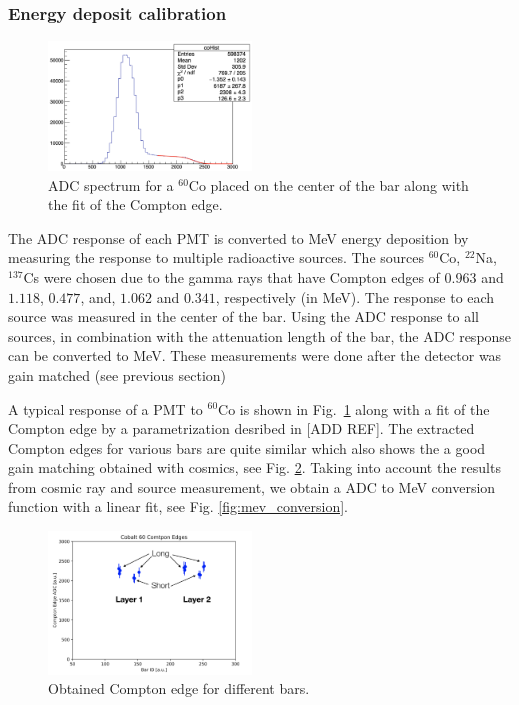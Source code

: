 \documentclass[3p,final,twocolumn]{elsarticle}
\begin{document}
\subsubsection{Energy deposit calibration}
\label{sec:energydeposit}
\begin{figure}[tbh]
	\centering
		\includegraphics[width=0.48\textwidth]{co-compton.png}
		\caption{ADC spectrum for a $^{60}$Co placed on the center of the bar along with the fit of the Compton edge.}
	\label{fig:compton_edge}
\end{figure}

The ADC response of each PMT is converted to \si{\mega\electronvolt} energy deposition by measuring the response to 
multiple radioactive sources. The sources $^{60}$Co, $^{22}$Na, $^{137}$Cs were chosen due to the gamma rays that have 
Compton edges of $0.963$ and $1.118$, $0.477$, and, $1.062$ and $0.341$, respectively (in \si{\mega\electronvolt}). The 
response to each source was measured in the center of the bar. Using the ADC response to all sources, in combination with the 
attenuation length of the bar, the ADC response can be converted to \si{\mega\electronvolt}. These measurements were done after the detector was gain matched (see previous section)

A typical response of a PMT to  $^{60}$Co is shown in Fig.~\ref{fig:compton_edge} along with a fit of the Compton edge by a parametrization desribed in [ADD REF]. The extracted Compton edges for various bars are quite similar which also shows the a good gain matching obtained with cosmics, see Fig. \ref{fig:edge_bars}. Taking into account the results from cosmic ray and  source measurement, we obtain a ADC to MeV conversion function with a linear fit, see Fig. \ref{fig:mev_conversion}.

\begin{figure}[tbh]
	\centering
			\includegraphics[width=0.48\textwidth]{coedges.png}
	\caption{Obtained Compton edge for different bars.}
	\label{fig:edge_bars}
\end{figure}
\end{document}
